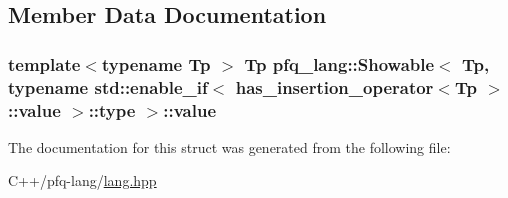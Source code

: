 \subsection{Member Data Documentation}
\hypertarget{structpfq__lang_1_1Showable_3_01Tp_00_01typename_01std_1_1enable__if_3_01has__insertion__operato0cfb72d444f463b2d87a78275e86feaa_a018c2b439d1d5587c824fadec0997c84}{
\subsubsection[{value}]{\setlength{\rightskip}{0pt plus 5cm}template$<$typename Tp $>$ Tp {\bf pfq\+\_\+lang\+::\+Showable}$<$ Tp, typename std\+::enable\+\_\+if$<$ {\bf has\+\_\+insertion\+\_\+operator}$<$Tp $>$\+::value $>$\+::type $>$\+::value}}\label{structpfq__lang_1_1Showable_3_01Tp_00_01typename_01std_1_1enable__if_3_01has__insertion__operato0cfb72d444f463b2d87a78275e86feaa_a018c2b439d1d5587c824fadec0997c84}


The documentation for this struct was generated from the following file\+:\begin{DoxyCompactItemize}
\item 
C++/pfq-\/lang/\hyperlink{lang_8hpp}{lang.\+hpp}\end{DoxyCompactItemize}
